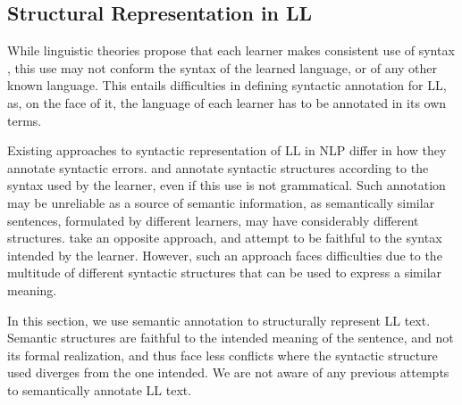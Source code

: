 \documentclass[letter,11pt]{article}
\begin{document}

\subsection{Structural Representation in LL}

While linguistic theories propose that each learner
makes consistent use of syntax \cite{huebner1985system,tarone1983variability},
this use may not conform the syntax of the learned language, or of any other known
language. This entails difficulties in defining syntactic annotation for LL,
as, on the face of it, the language of each learner has to be annotated
in its own terms.

Existing approaches to syntactic representation of LL in NLP
differ in how they annotate syntactic errors.
 and 
annotate syntactic structures according to the syntax used
by the learner, even if this use is not grammatical.
Such annotation may be unreliable as a source of semantic information,
as semantically similar sentences, formulated by different learners,
may have considerably different structures.  take an opposite approach, and attempt
to be faithful to the syntax intended by the learner. However, such an
approach faces difficulties due to the multitude of different syntactic
structures that can be used to express a similar meaning.


In this section, we use semantic annotation to structurally
represent LL text. Semantic structures are faithful to the intended
meaning of the sentence, and not its formal realization, and thus face
less conflicts where the syntactic structure used diverges from
the one intended. We are not aware of any previous attempts to semantically
annotate LL text.
\end{document}
